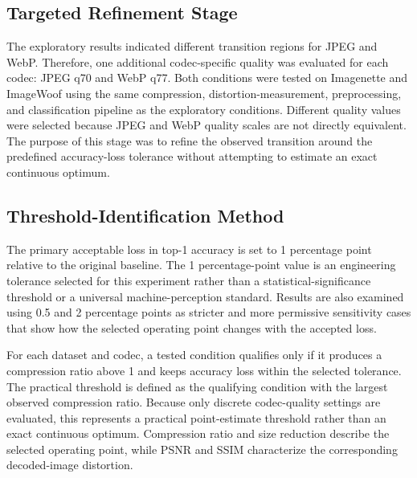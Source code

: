 \subsection{Targeted Refinement Stage}

The exploratory results indicated different transition regions for JPEG and WebP. Therefore, one additional codec-specific quality was evaluated for each codec: JPEG q70 and WebP q77. Both conditions were tested on Imagenette and ImageWoof using the same compression, distortion-measurement, preprocessing, and classification pipeline as the exploratory conditions. Different quality values were selected because JPEG and WebP quality scales are not directly equivalent. The purpose of this stage was to refine the observed transition around the predefined accuracy-loss tolerance without attempting to estimate an exact continuous optimum.

\subsection{Threshold-Identification Method}

The primary acceptable loss in top-1 accuracy is set to 1 percentage point relative to the original baseline. The 1 percentage-point value is an engineering tolerance selected for this experiment rather than a statistical-significance threshold or a universal machine-perception standard. Results are also examined using 0.5 and 2 percentage points as stricter and more permissive sensitivity cases that show how the selected operating point changes with the accepted loss.

For each dataset and codec, a tested condition qualifies only if it produces a compression ratio above 1 and keeps accuracy loss within the selected tolerance. The practical threshold is defined as the qualifying condition with the largest observed compression ratio. Because only discrete codec-quality settings are evaluated, this represents a practical point-estimate threshold rather than an exact continuous optimum. Compression ratio and size reduction describe the selected operating point, while PSNR and SSIM characterize the corresponding decoded-image distortion.
